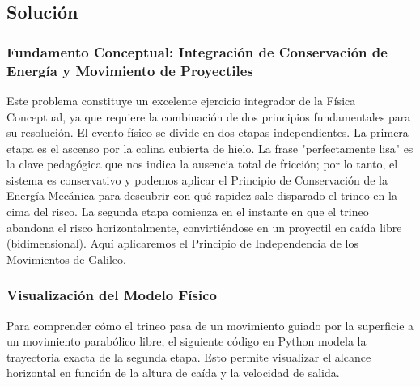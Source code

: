 \documentclass[12pt,a4paper]{article}
\begin{document}
\subsection*{Solución}

\subsubsection*{Fundamento Conceptual: Integración de Conservación de Energía y Movimiento de Proyectiles}
Este problema constituye un excelente ejercicio integrador de la Física Conceptual, ya que requiere la combinación de dos principios fundamentales para su resolución. El evento físico se divide en dos etapas independientes. La primera etapa es el ascenso por la colina cubierta de hielo. La frase "perfectamente lisa" es la clave pedagógica que nos indica la ausencia total de fricción; por lo tanto, el sistema es conservativo y podemos aplicar el Principio de Conservación de la Energía Mecánica para descubrir con qué rapidez sale disparado el trineo en la cima del risco. La segunda etapa comienza en el instante en que el trineo abandona el risco horizontalmente, convirtiéndose en un proyectil en caída libre (bidimensional). Aquí aplicaremos el Principio de Independencia de los Movimientos de Galileo.

\subsubsection*{Visualización del Modelo Físico}
Para comprender cómo el trineo pasa de un movimiento guiado por la superficie a un movimiento parabólico libre, el siguiente código en Python modela la trayectoria exacta de la segunda etapa. Esto permite visualizar el alcance horizontal en función de la altura de caída y la velocidad de salida.
\end{document}
